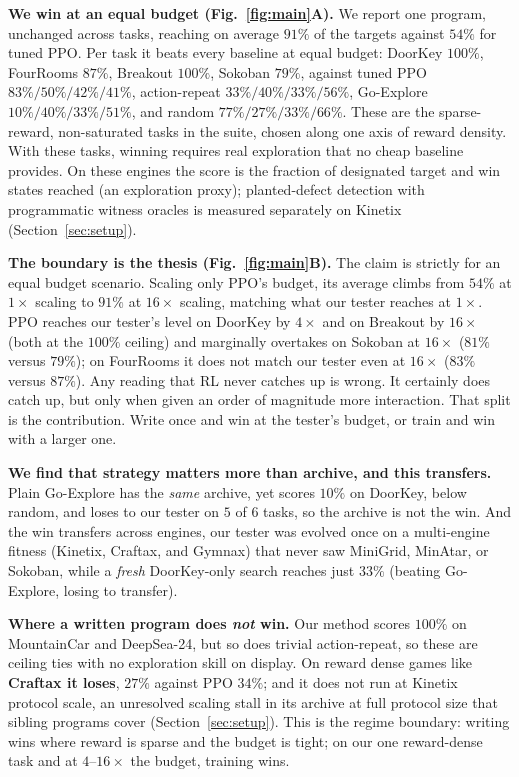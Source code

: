 \documentclass{article}
\begin{document}
\textbf{We win at an equal budget (Fig.~\ref{fig:main}A).} We report one program, unchanged across tasks, reaching on average
$91\%$ of the targets against $54\%$ for tuned PPO. Per task it beats every baseline at equal budget: DoorKey $100\%$,
FourRooms $87\%$, Breakout $100\%$, Sokoban $79\%$, against tuned PPO $83\%/50\%/42\%/41\%$, action-repeat
$33\%/40\%/33\%/56\%$, Go-Explore $10\%/40\%/33\%/51\%$, and random $77\%/27\%/33\%/66\%$. These are the sparse-reward,
non-saturated tasks in the suite, chosen along one axis of reward density. With these tasks, winning requires real exploration that no
cheap baseline provides. On these engines the score is the fraction of designated target and win states reached (an exploration proxy); planted-defect detection with programmatic witness oracles is measured separately on Kinetix (Section~\ref{sec:setup}).

\textbf{The boundary is the thesis (Fig.~\ref{fig:main}B).} The claim is strictly for an equal budget scenario. Scaling only PPO's budget,
its average climbs from $54\%$ at $1\times$ scaling to $91\%$ at $16\times$ scaling, matching what our tester reaches at $1\times$. PPO reaches our tester's level on DoorKey by $4\times$ and on Breakout by $16\times$ (both at the $100\%$ ceiling) and marginally overtakes on Sokoban at $16\times$ ($81\%$ versus $79\%$); on FourRooms it does not match our tester even at $16\times$ ($83\%$ versus $87\%$). Any reading that RL never catches up is wrong. It certainly does catch up, but only when given an order of magnitude more interaction. That split is the contribution. Write
once and win at the tester's budget, or train and win with a larger one.

\textbf{We find that strategy matters more than archive, and this transfers.} Plain Go-Explore has the \emph{same} archive, yet scores $10\%$ on
DoorKey, below random, and loses to our tester on $5$ of $6$ tasks, so the archive is not the win. And the win transfers
across engines, our tester was evolved once on a multi-engine fitness (Kinetix, Craftax, and Gymnax) that never saw
MiniGrid, MinAtar, or Sokoban, while a \emph{fresh} DoorKey-only search reaches just $33\%$ (beating Go-Explore, losing to
transfer). 

\textbf{Where a written program does \emph{not} win.} Our method scores $100\%$ on MountainCar and DeepSea-24, but so does trivial action-repeat, so these are ceiling ties with no exploration skill on display. On reward dense games like \textbf{Craftax it loses}, $27\%$ against PPO $34\%$; and it does not run at Kinetix
protocol scale, an unresolved scaling stall in its archive at full protocol size that sibling programs cover (Section~\ref{sec:setup}). This is the
regime boundary: writing wins where reward is sparse and the budget is tight; on our one reward-dense task and at
$4$--$16\times$ the budget, training wins.
\end{document}
